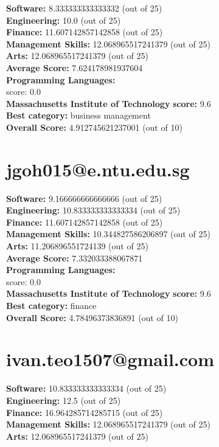 \documentclass{article}
\begin{document}
\textbf{Software:} 8.333333333333332 (out of 25)\\
\textbf{Engineering: } 10.0 (out of 25)\\
\textbf{Finance:} 11.607142857142858 (out of 25)\\
\textbf{Management Skills:} 12.068965517241379 (out of 25)\\
\textbf{Arts:} 12.068965517241379 (out of 25)\\
\textbf{Average Score: } 7.624178981937604\\
\textbf{Programming Languages:} \\
score: 0.0\\
\textbf{Massachusetts Institute of Technology} \textbf{score:} 9.6\\
\textbf{Best category: } business management\\
\textbf{Overall Score: }4.912745621237001 (out of 10)\section{jgoh015@e.ntu.edu.sg}
\textbf{Software:} 9.166666666666666 (out of 25)\\
\textbf{Engineering: } 10.833333333333334 (out of 25)\\
\textbf{Finance:} 11.607142857142858 (out of 25)\\
\textbf{Management Skills:} 10.344827586206897 (out of 25)\\
\textbf{Arts:} 11.206896551724139 (out of 25)\\
\textbf{Average Score: } 7.332033388067871\\
\textbf{Programming Languages:} \\
score: 0.0\\
\textbf{Massachusetts Institute of Technology} \textbf{score:} 9.6\\
\textbf{Best category: } finance\\
\textbf{Overall Score: }4.78496373836891 (out of 10)\section{ivan.teo1507@gmail.com}
\textbf{Software:} 10.833333333333334 (out of 25)\\
\textbf{Engineering: } 12.5 (out of 25)\\
\textbf{Finance:} 16.964285714285715 (out of 25)\\
\textbf{Management Skills:} 12.068965517241379 (out of 25)\\
\textbf{Arts:} 12.068965517241379 (out of 25)\\
\end{document}
